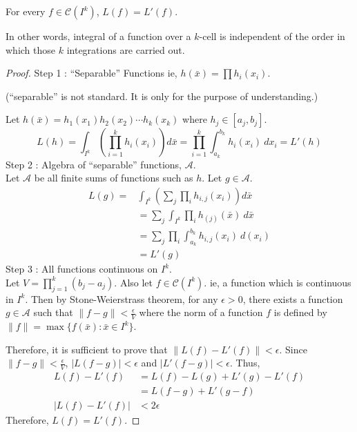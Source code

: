 \begin{theorem}
	For every $f \in \mathscr{C}(I^k)$, $L(f) = L'(f)$.

\begin{commentary}
	In other words, integral of a function over a $k$-cell is independent of the order in which those $k$ integrations are carried out.
\end{commentary}
\end{theorem}
\begin{proof}
	Step 1 : ``Separable'' Functions ie, $h(\bar{x}) = \prod h_i(x_i)$.\\
	\begin{commentary}
		(``separable'' is not standard.
		It is only for the purpose of understanding.)
	\end{commentary}

	Let $h(\bar{x}) = h_1(x_1)h_2(x_2)\cdots h_k(x_k)$ where $h_j \in [a_j,b_j]$.
	$$ L(h) = \int_{I^k} \left(\prod_{i = 1}^k h_i(x_i)\right) d\bar{x} = \prod_{i = 1}^k \int_{a_k}^{b_k} h_i(x_i)\ dx_i = L'(h)$$
	Step 2 : Algebra of ``separable'' functions, $\mathscr{A}$.\\
	Let $\mathscr{A}$ be all finite sums of functions such as $h$.
	Let $g \in \mathscr{A}$.
	\begin{align*}
		L(g) = & \int_{I^k} \left(\sum_j \prod_i h_{i,j}(x_i) \right) d\bar{x} \\
		& = \sum_j \int_{I^k} \prod_i h_{(j)}(\bar{x})\ d\bar{x}\\
		& = \sum_j \prod_i \int_{a_k}^{b_k} h_{i,j}(x_i)\ d(x_i)\\
		& = L'(g)
	\end{align*}
	Step 3 : All functions continuous on $I^k$.\\
	Let $V = \prod_{j = 1}^k (b_j - a_j)$.
	Also let $f \in \mathscr{C}(I^k)$.
	ie, a function which is continuous in $I^k$.
	Then by Stone-Weierstrass theorem,
	for any $\epsilon > 0$,	there exists a function $g \in \mathscr{A}$
	such that $\|f-g\| < \frac{\epsilon}{V}$
	where the norm of a function $f$ is defined by
	$\|f\| = \max\{f(\bar{x}) : \bar{x} \in I^k\}$.

	Therefore, it is sufficient to prove that $\|L(f)-L'(f)\| < \epsilon$.
	Since $\|f-g\| < \frac{\epsilon}{V}$, $|L(f-g)| < \epsilon$ and $|L'(f-g)| < \epsilon$. Thus,
	\begin{align*}
		L(f)-L'(f) & = L(f) - L(g) + L'(g) - L'(f) \\
		& = L(f-g) + L'(g-f)\\
		|L(f)-L'(f)| & < 2\epsilon
	\end{align*}
	Therefore, $L(f) = L'(f)$.
\end{proof}

